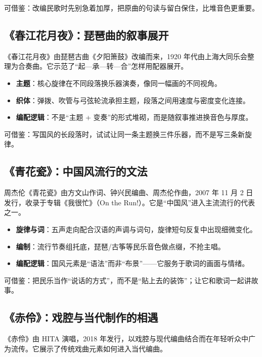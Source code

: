 可借鉴：改编民歌时先别急着加厚，把原曲的句读与留白保住，比堆音色更重要。

\subsection{《春江花月夜》：琵琶曲的叙事展开}
\label{sec:guofeng-case-spring-river}

《春江花月夜》由琵琶古曲《夕阳箫鼓》改编而来，1920 年代由上海大同乐会整理为合奏曲。它示范了“起—承—转—合”怎样用配器展开。

\begin{itemize}
\item \textbf{主题}：核心旋律在不同段落换乐器演奏，像同一幅画的不同视角。
\item \textbf{织体}：弹拨、吹管与弓弦轮流承担主题，段落之间用速度与密度变化连接。
\item \textbf{编配逻辑}：不是“主题 + 变奏”的形式堆砌，而是随叙事推进换音色与厚度。
\end{itemize}

可借鉴：写国风的长段落时，试试让同一条主题换三件乐器，而不是写三条新旋律。

\subsection{《青花瓷》：中国风流行的文法}
\label{sec:guofeng-case-blue-and-white}

周杰伦《青花瓷》由方文山作词、钟兴民编曲、周杰伦作曲，2007 年 11 月 2 日发行，收录于专辑《我很忙》（On the Run!）。它是“中国风”进入主流流行的代表之一。

\begin{itemize}
\item \textbf{旋律与词}：五声走向配合汉语的声调与词句，旋律短句反复中出现细微变化。
\item \textbf{编制}：流行节奏组托底，琵琶/古筝等民乐音色做点缀，不抢主唱。
\item \textbf{编配逻辑}：国风元素是“语法”而非“布景”——它服务于歌词的画面与情绪。
\end{itemize}

可借鉴：把民乐当作“说话的方式”，而不是“贴上去的装饰”；让它和歌词一起讲故事。

\subsection{《赤伶》：戏腔与当代制作的相遇}
\label{sec:guofeng-case-chiling}

《赤伶》由 HITA 演唱，2018 年发行，以戏腔与现代编曲结合而在年轻听众中广为流传。它展示了传统戏曲元素如何进入当代编曲。

